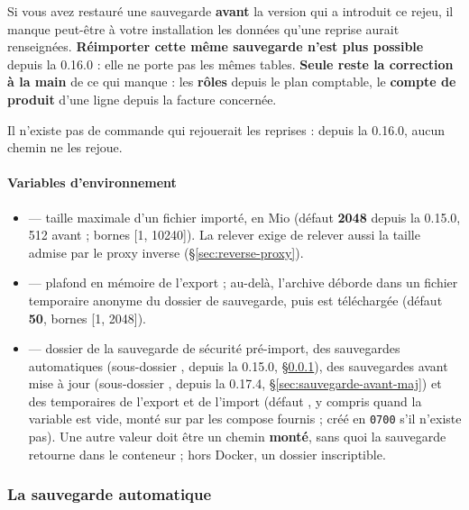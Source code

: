 \documentclass[a4paper,11pt,oneside]{article}
\begin{document}
\begin{keshwarning}
Si vous avez restauré une sauvegarde \textbf{avant} la version qui a introduit ce rejeu, il manque peut-être à votre installation les données qu'une reprise aurait renseignées. \textbf{Réimporter cette même sauvegarde n'est plus possible} depuis la 0.16.0 : elle ne porte pas les mêmes tables. \textbf{Seule reste la correction à la main} de ce qui manque : les \textbf{rôles} depuis le plan comptable, le \textbf{compte de produit} d'une ligne depuis la facture concernée.

Il n'existe pas de commande qui rejouerait les reprises : depuis la 0.16.0, aucun chemin ne les rejoue.
\end{keshwarning}

\paragraph{Variables d'environnement}

\begin{itemize}
    \item {} — taille maximale d'un fichier  importé, en Mio (défaut \textbf{2048} depuis la 0.15.0, 512 avant ; bornes [1, 10240]). La relever exige de relever aussi la taille admise par le proxy inverse (\S\ref{sec:reverse-proxy}).
    \item {} — plafond en mémoire de l'export ; au-delà, l'archive déborde dans un fichier temporaire anonyme du dossier de sauvegarde, puis est téléchargée (défaut \textbf{50}, bornes [1, 2048]).
    \item \sloppy{} — dossier de la sauvegarde de sécurité pré-import, des sauvegardes automatiques (sous-dossier , depuis la 0.15.0, \S\ref{sec:sauvegarde-automatique}), des sauvegardes avant mise à jour (sous-dossier , depuis la 0.17.4, \S\ref{sec:sauvegarde-avant-maj}) et des temporaires de l'export et de l'import (défaut , y compris quand la variable est vide, monté sur  par les compose fournis ; créé en \texttt{0700} s'il n'existe pas). Une autre valeur doit être un chemin \textbf{monté}, sans quoi la sauvegarde retourne dans le conteneur ; hors Docker, un dossier inscriptible.
\end{itemize}

\subsubsection{La sauvegarde automatique}\label{sec:sauvegarde-automatique}
\end{document}
